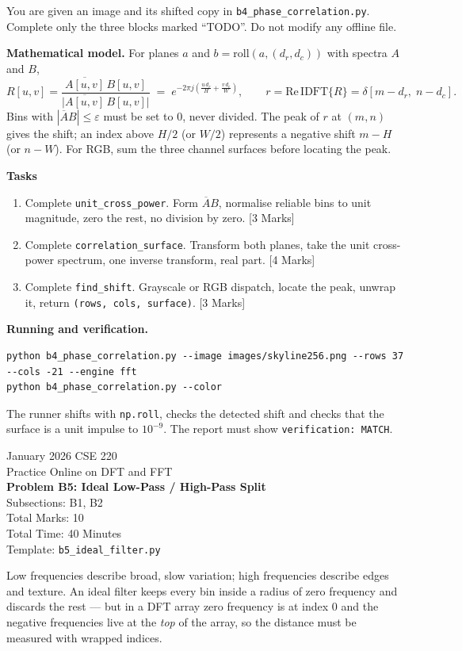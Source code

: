 \documentclass[11pt]{article}
\newcommand{\file}[1]{\texttt{#1}}
\newcommand{\code}[1]{\texttt{#1}}
\newcommand{\problemheader}[3]{%
  \begin{center}
    {\large January 2026 CSE 220}\\
    {\large Practice Online on DFT and FFT}\\[2pt]
    {\Large\bfseries #1}\\[2pt]
    Subsections: #2\\
    Total Marks: 10\\
    Total Time: 40 Minutes\\[2pt]
    {\small Template: \file{#3}}
  \end{center}
  \vspace{4pt}
}
\begin{document}
You are given an image and its shifted copy in
\file{b4\_phase\_correlation.py}. Complete only the three blocks marked
``TODO''. Do not modify any offline file.

\textbf{Mathematical model.} For planes $a$ and $b = \mathrm{roll}(a, (d_r, d_c))$
with spectra $A$ and $B$,
\[
  R[u,v] = \frac{\overline{A[u,v]}\, B[u,v]}{\big|\overline{A[u,v]}\, B[u,v]\big|}
  \;=\; e^{-2\pi j \left( \frac{u\, d_r}{H} + \frac{v\, d_c}{W} \right)},
  \qquad r = \mathrm{Re}\,\mathrm{IDFT}\{R\} = \delta[m - d_r,\; n - d_c].
\]
Bins with $|\overline{A} B| \le \varepsilon$ must be set to $0$, never divided.
The peak of $r$ at $(m, n)$ gives the shift; an index above $H/2$ (or $W/2$)
represents a negative shift $m - H$ (or $n - W$). For RGB, sum the three
channel surfaces before locating the peak.

\textbf{Tasks}
\begin{enumerate}[nosep]
  \item Complete \code{unit\_cross\_power}. Form $\overline{A} B$, normalise
        reliable bins to unit magnitude, zero the rest, no division by zero.
        \hfill [3 Marks]
  \item Complete \code{correlation\_surface}. Transform both planes, take the
        unit cross-power spectrum, one inverse transform, real part.
        \hfill [4 Marks]
  \item Complete \code{find\_shift}. Grayscale or RGB dispatch, locate the
        peak, unwrap it, return \code{(rows, cols, surface)}.
        \hfill [3 Marks]
\end{enumerate}

\textbf{Running and verification.}
\begin{lstlisting}
python b4_phase_correlation.py --image images/skyline256.png --rows 37 --cols -21 --engine fft
python b4_phase_correlation.py --color
\end{lstlisting}
The runner shifts with \code{np.roll}, checks the detected shift and checks
that the surface is a unit impulse to $10^{-9}$. The report must show
\code{verification: MATCH}.

\newpage
\problemheader{Problem B5: Ideal Low-Pass / High-Pass Split}{B1, B2}{b5\_ideal\_filter.py}

Low frequencies describe broad, slow variation; high frequencies describe
edges and texture. An ideal filter keeps every bin inside a radius of zero
frequency and discards the rest --- but in a DFT array zero frequency is at
index $0$ and the negative frequencies live at the \emph{top} of the array, so
the distance must be measured with wrapped indices.
\end{document}
